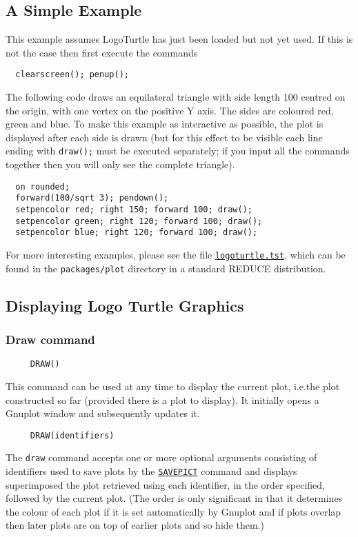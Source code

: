 \subsection{A Simple Example}

This example assumes LogoTurtle has just been loaded but not yet used.
If this is not the case then first execute the commands
\begin{verbatim}
  clearscreen(); penup();
\end{verbatim}

The following code draws an equilateral triangle with side length 100
centred on the origin, with one vertex on the positive Y axis.  The
sides are coloured red, green and blue.  To make this example as
interactive as possible, the plot is displayed after each side is
drawn (but for this effect to be visible each line ending with
\texttt{draw();} must be executed separately; if you input all the
commands together then you will only see the complete triangle).
\begin{verbatim}
  on rounded;
  forward(100/sqrt 3); pendown();
  setpencolor red; right 150; forward 100; draw();
  setpencolor green; right 120; forward 100; draw();
  setpencolor blue; right 120; forward 100; draw();
\end{verbatim}

For more interesting examples, please see the file
\href{https://sourceforge.net/p/reduce-algebra/code/HEAD/tree/trunk/packages/plot/logoturtle.tst}
     {\texttt{logoturtle.tst}}, which can be found in the
     \texttt{packages/plot} directory in a standard REDUCE
     distribution.


\subsection{Displaying Logo Turtle Graphics}

\subsubsection*{Draw command}
\begin{verbatim}
     DRAW()
\end{verbatim}
\label{logoturtle:draw}
This command can be used at any time to display the current plot,
i.e.\@ the plot constructed so far (provided there is a plot to
display).  It initially opens a Gnuplot window and subsequently
updates it.

\begin{verbatim}
     DRAW(identifiers)
\end{verbatim}
The \texttt{draw} command accepts one or more optional arguments
consisting of identifiers used to save plots by the
\hyperref[logoturtle:savepict]{\texttt{SAVEPICT}} command and displays
superimposed the plot retrieved using each identifier, in the order
specified, followed by the current plot.  (The order is only
significant in that it determines the colour of each plot if it is set
automatically by Gnuplot and if plots overlap then later plots are on
top of earlier plots and so hide them.)


